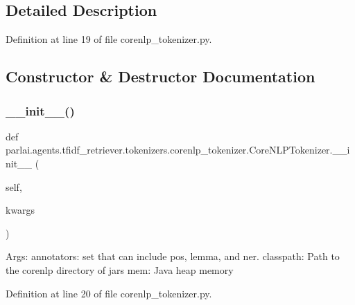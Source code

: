 \subsection{Detailed Description}


Definition at line 19 of file corenlp\+\_\+tokenizer.\+py.



\subsection{Constructor \& Destructor Documentation}
\mbox{\label{classparlai_1_1agents_1_1tfidf__retriever_1_1tokenizers_1_1corenlp__tokenizer_1_1CoreNLPTokenizer_a69a5d8b41630a6bb53b3680a68136e8f}} 
\subsubsection{\texorpdfstring{\+\_\+\+\_\+init\+\_\+\+\_\+()}{\_\_init\_\_()}}
{\footnotesize\ttfamily def parlai.\+agents.\+tfidf\+\_\+retriever.\+tokenizers.\+corenlp\+\_\+tokenizer.\+Core\+N\+L\+P\+Tokenizer.\+\_\+\+\_\+init\+\_\+\+\_\+ (\begin{DoxyParamCaption}\item[{}]{self,  }\item[{}]{kwargs }\end{DoxyParamCaption})}

\begin{DoxyVerb}Args:
    annotators: set that can include pos, lemma, and ner.
    classpath: Path to the corenlp directory of jars
    mem: Java heap memory
\end{DoxyVerb}
 

Definition at line 20 of file corenlp\+\_\+tokenizer.\+py.



